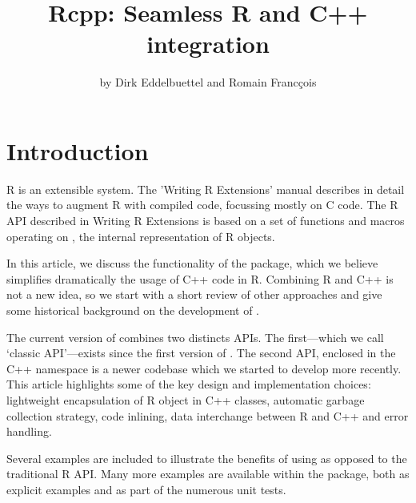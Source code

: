 
\title{Rcpp: Seamless R and C++ integration}
\author{by Dirk Eddelbuettel and Romain Franc\c{c}ois}

\maketitle


\section{Introduction} 

R is an extensible system. The 'Writing R Extensions' manual \citep{R:exts}
describes in detail the ways to augment R with compiled code,
focussing mostly on C code. The R API described in Writing R Extensions is
based on a set of functions and macros operating on , the internal
representation of R objects.

In this article, we discuss the functionality of the 
package, which we believe simplifies dramatically the usage of C++ code
in R. Combining R and C++ is not a new idea, so we start with
a short review of other approaches and give some historical
background on the development of .

The current version of  combines two distincts
APIs. The first---which we call `classic  API'---exists since 
the first version of . The second API, enclosed in the 
 C++ namespace is a newer codebase which we started to develop
more recently. This article 
highlights some of the key design and implementation choices: 
lightweight encapsulation of R object in C++ classes, automatic
garbage collection strategy, code inlining, data interchange between 
R and C++ and error handling. 

Several examples are included to illustrate the benefits of using 
as opposed to the traditional R API. Many more examples are available within
the package, both as explicit examples and as part of the numerous unit tests.

